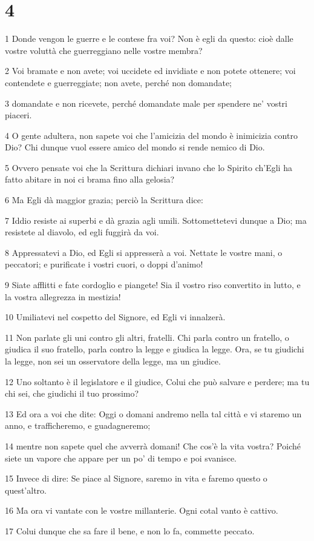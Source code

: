 \chapter{4}

\par 1 Donde vengon le guerre e le contese fra voi? Non è egli da questo: cioè dalle vostre voluttà che guerreggiano nelle vostre membra?
\par 2 Voi bramate e non avete; voi uccidete ed invidiate e non potete ottenere; voi contendete e guerreggiate; non avete, perché non domandate;
\par 3 domandate e non ricevete, perché domandate male per spendere ne' vostri piaceri.
\par 4 O gente adultera, non sapete voi che l'amicizia del mondo è inimicizia contro Dio? Chi dunque vuol essere amico del mondo si rende nemico di Dio.
\par 5 Ovvero pensate voi che la Scrittura dichiari invano che lo Spirito ch'Egli ha fatto abitare in noi ci brama fino alla gelosia?
\par 6 Ma Egli dà maggior grazia; perciò la Scrittura dice:
\par 7 Iddio resiste ai superbi e dà grazia agli umili. Sottomettetevi dunque a Dio; ma resistete al diavolo, ed egli fuggirà da voi.
\par 8 Appressatevi a Dio, ed Egli si appresserà a voi. Nettate le vostre mani, o peccatori; e purificate i vostri cuori, o doppi d'animo!
\par 9 Siate afflitti e fate cordoglio e piangete! Sia il vostro riso convertito in lutto, e la vostra allegrezza in mestizia!
\par 10 Umiliatevi nel cospetto del Signore, ed Egli vi innalzerà.
\par 11 Non parlate gli uni contro gli altri, fratelli. Chi parla contro un fratello, o giudica il suo fratello, parla contro la legge e giudica la legge. Ora, se tu giudichi la legge, non sei un osservatore della legge, ma un giudice.
\par 12 Uno soltanto è il legislatore e il giudice, Colui che può salvare e perdere; ma tu chi sei, che giudichi il tuo prossimo?
\par 13 Ed ora a voi che dite: Oggi o domani andremo nella tal città e vi staremo un anno, e trafficheremo, e guadagneremo;
\par 14 mentre non sapete quel che avverrà domani! Che cos'è la vita vostra? Poiché siete un vapore che appare per un po' di tempo e poi svanisce.
\par 15 Invece di dire: Se piace al Signore, saremo in vita e faremo questo o quest'altro.
\par 16 Ma ora vi vantate con le vostre millanterie. Ogni cotal vanto è cattivo.
\par 17 Colui dunque che sa fare il bene, e non lo fa, commette peccato.

